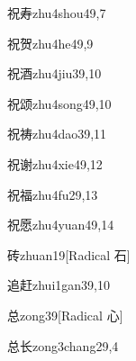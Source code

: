 \begin{verbete}{祝寿}{zhu4shou4}{9,7}
\end{verbete}

\begin{verbete}{祝贺}{zhu4he4}{9,9}
\end{verbete}

\begin{verbete}{祝酒}{zhu4jiu3}{9,10}
\end{verbete}

\begin{verbete}{祝颂}{zhu4song4}{9,10}
\end{verbete}

\begin{verbete}{祝祷}{zhu4dao3}{9,11}
\end{verbete}

\begin{verbete}{祝谢}{zhu4xie4}{9,12}
\end{verbete}

\begin{verbete}{祝福}{zhu4fu2}{9,13}
\end{verbete}

\begin{verbete}{祝愿}{zhu4yuan4}{9,14}
\end{verbete}

\begin{verbete}{砖}{zhuan1}{9}[Radical 石]
\end{verbete}

\begin{verbete}{追赶}{zhui1gan3}{9,10}
\end{verbete}

\begin{verbete}{总}{zong3}{9}[Radical 心]
\end{verbete}

\begin{verbete}{总长}{zong3chang2}{9,4}
\end{verbete}

